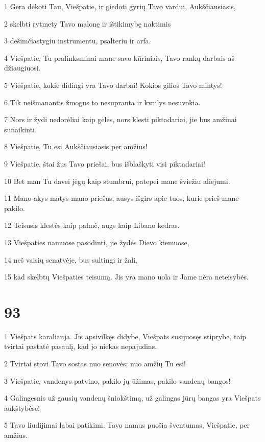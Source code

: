 \par 1 Gera dėkoti Tau, Viešpatie, ir giedoti gyrių Tavo vardui, Aukščiausiasis, 
\par 2 skelbti rytmety Tavo malonę ir ištikimybę naktimis 
\par 3 dešimčiastygiu instrumentu, psalteriu ir arfa. 
\par 4 Viešpatie, Tu pralinksminai mane savo kūriniais, Tavo rankų darbais aš džiaugiuosi. 
\par 5 Viešpatie, kokie didingi yra Tavo darbai! Kokios gilios Tavo mintys! 
\par 6 Tik neišmanantis žmogus to nesupranta ir kvailys nesuvokia. 
\par 7 Nors ir žydi nedorėliai kaip gėlės, nors klesti piktadariai, jie bus amžinai sunaikinti. 
\par 8 Viešpatie, Tu esi Aukščiausiasis per amžius! 
\par 9 Viešpatie, štai žus Tavo priešai, bus išblaškyti visi piktadariai! 
\par 10 Bet man Tu davei jėgų kaip stumbrui, patepei mane šviežiu aliejumi. 
\par 11 Mano akys matys mano priešus, ausys išgirs apie tuos, kurie prieš mane pakilo. 
\par 12 Teisusis klestės kaip palmė, augs kaip Libano kedras. 
\par 13 Viešpaties namuose pasodinti, jie žydės Dievo kiemuose, 
\par 14 neš vaisių senatvėje, bus sultingi ir žali, 
\par 15 kad skelbtų Viešpaties teisumą. Jis yra mano uola ir Jame nėra neteisybės.


\chapter{93}


\par 1 Viešpats karaliauja. Jis apsivilkęs didybe, Viešpats susijuosęs stiprybe, taip tvirtai pastatė pasaulį, kad jo niekas nepajudins. 
\par 2 Tvirtai stovi Tavo sostas nuo senovės; nuo amžių Tu esi! 
\par 3 Viešpatie, vandenys patvino, pakilo jų ūžimas, pakilo vandenų bangos! 
\par 4 Galingesnis už gausių vandenų šniokštimą, už galingas jūrų bangas yra Viešpats aukštybėse! 
\par 5 Tavo liudijimai labai patikimi. Tavo namus puošia šventumas, Viešpatie, per amžius.


